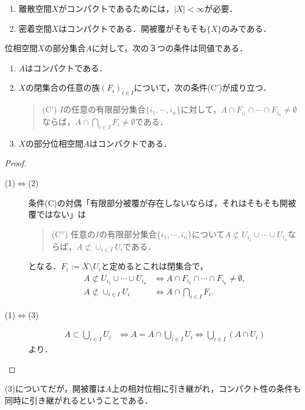 \documentclass[uplatex,dvipdfmx]{jsreport}
\begin{document}
\begin{example}\mbox{}
    \begin{enumerate}
        \item 離散空間$X$がコンパクトであるためには，$|X|<\infty$が必要．
        \item 密着空間$X$はコンパクトである．開被覆がそもそも$\{X\}$のみである．
    \end{enumerate}
\end{example}

\begin{proposition}\label{prop-characterization-of-compactness-as-space}
    位相空間$X$の部分集合$A$に対して，次の３つの条件は同値である．
    \begin{enumerate}
        \item $A$はコンパクトである．
        \item $X$の閉集合の任意の族$(F_i)_{i\in I}$について，次の条件(C')が成り立つ．\begin{quote}
            (C') $I$の任意の有限部分集合$\{i_1,\cdots,i_n\}$に対して，$A\cap F_{i_1}\cap\cdots\cap F_{i_n}\ne\emptyset$ならば，$A\cap\bigcap_{i\in I}F_i\ne\emptyset$である．
        \end{quote}
        \item $X$の部分位相空間$A$はコンパクトである．
    \end{enumerate}
\end{proposition}
\begin{proof}
    \begin{description}
        \item[(1)$\Leftrightarrow$(2)] 条件(C)の対偶「有限部分被覆が存在しないならば，それはそもそも開被覆ではない」は
        \begin{quote}
            (C'') 任意の$I$の有限部分集合$\{i_1,\cdots,i_n\}$について$A\not\subset U_{i_1}\cup\cdots\cup U_{i_n}$ならば，$A\not\subset \cup_{i\in I}U_i$である．
        \end{quote}
        となる．$F_i:=X\setminus U_i$と定めるとこれは閉集合で，
        \begin{align*}
            A\not\subset U_{i_1}\cup\cdots\cup U_{i_n}&\Leftrightarrow A\cap F_{i_1}\cap\cdots\cap F_{i_n}\ne\emptyset,\\
            A\not\subset \cup_{i\in I}U_i&\Leftrightarrow A\cap\bigcap_{i\in I}F_i.
        \end{align*}
        \item[(1)$\Leftrightarrow$(3)]
        \begin{align*}
            A\subset\bigcup_{i\in I}U_i&\Leftrightarrow A=A\cap\bigcup_{i\in I}U_i\Leftrightarrow \bigcup_{i\in I}(A\cap U_i)
        \end{align*}
        より．
    \end{description}
\end{proof}
\begin{remarks}
    (3)についてだが，開被覆は$A$上の相対位相に引き継がれ，コンパクト性の条件も同時に引き継がれるということである．
\end{remarks}
\end{document}
